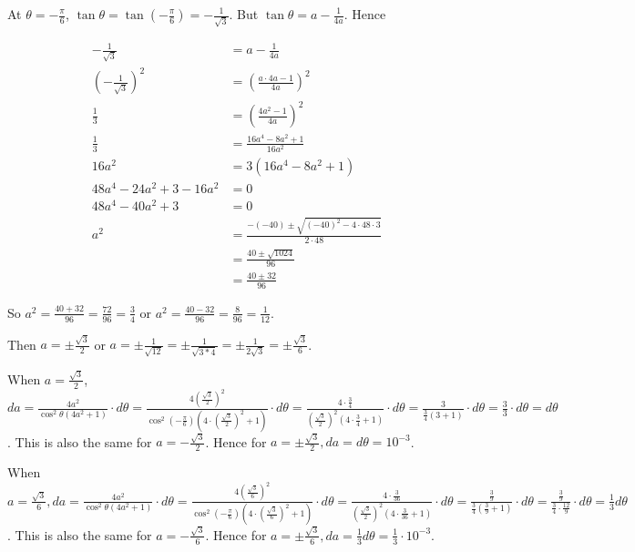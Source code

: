 \documentclass[9pt]{article}
\begin{document}
At $\theta = -\frac{\pi}{6}$, $\tan \theta = \tan (-\frac{\pi}{6}) = -\frac{1}{\sqrt{3}}$. But $\tan \theta = a - \frac{1}{4a}$. Hence

\begin{align*}
  -\frac{1}{\sqrt{3}} &= a - \frac{1}{4a} \\
  (-\frac{1}{\sqrt{3}})^2 &= (\frac{a \cdot 4a - 1}{4a})^2 \\
  \frac{1}{3} &= (\frac{4a^2 - 1}{4a})^2 \\
  \frac{1}{3} &= \frac{16a^4 - 8a^2 + 1}{16a^2} \\
  16a^2 &= 3(16a^4 - 8a^2 + 1) \\
  48a^4 - 24a^2 + 3 - 16a^2 &= 0 \\
  48a^4 - 40a^2 + 3 &= 0 \\
  a^2 &= \frac{-(-40) \pm \sqrt{(-40)^2 - 4 \cdot 48 \cdot 3}}{2 \cdot 48} \\
      &= \frac{40 \pm \sqrt{1024}}{96} \\
      &= \frac{40 \pm 32}{96}
\end{align*}

So $a^2 = \frac{40 + 32}{96} = \frac{72}{96} = \frac{3}{4}$ or $a^2 = \frac{40 - 32}{96} = \frac{8}{96} = \frac{1}{12}$.

Then $a = \pm \frac{\sqrt{3}}{2}$ or $a = \pm \frac{1}{\sqrt{12}} = \pm \frac{1}{\sqrt{3 * 4}} = \pm \frac{1}{2 \sqrt{3}} = \pm \frac{\sqrt{3}}{6}$.

When $a = \frac{\sqrt{3}}{2}$, $da = \frac{4a^2}{\cos^2 \theta (4a^2 + 1)} \cdot d \theta = \frac{4 (\frac{\sqrt{3}}{2})^2}{\cos^2 (-\frac{\pi}{6}) (4 \cdot (\frac{\sqrt{3}}{2})^2 + 1)} \cdot d \theta = \frac{4 \cdot \frac{3}{4}}{(\frac{\sqrt{3}}{2})^2 (4 \cdot \frac{3}{4} + 1)} \cdot d \theta = \frac{3}{\frac{3}{4} (3 + 1)} \cdot d \theta = \frac{3}{3} \cdot d \theta = d \theta$. This is also the same for $a = -\frac{\sqrt{3}}{2}$. Hence for $a = \pm \frac{\sqrt{3}}{2}, da = d \theta = 10^{-3}$.

When $a = \frac{\sqrt{3}}{6}, da = \frac{4a^2}{\cos^2 \theta (4a^2 + 1)} \cdot d \theta = \frac{4 (\frac{\sqrt{3}}{6})^2}{\cos^2 (-\frac{\pi}{6}) (4 \cdot (\frac{\sqrt{3}}{6})^2 + 1)} \cdot d \theta = \frac{4 \cdot \frac{3}{36}}{(\frac{\sqrt{3}}{2})^2 (4 \cdot \frac{3}{36} + 1)} \cdot d \theta = \frac{\frac{3}{9}}{\frac{3}{4}(\frac{3}{9} + 1)} \cdot d \theta = \frac{\frac{3}{9}}{\frac{3}{4} \cdot \frac{12}{9}} \cdot d \theta = \frac{1}{3} d \theta$. This is also the same for $a = -\frac{\sqrt{3}}{6}$. Hence for $a = \pm \frac{\sqrt{3}}{6}, da = \frac{1}{3} d \theta = \frac{1}{3} \cdot 10^{-3}$.
\end{document}
